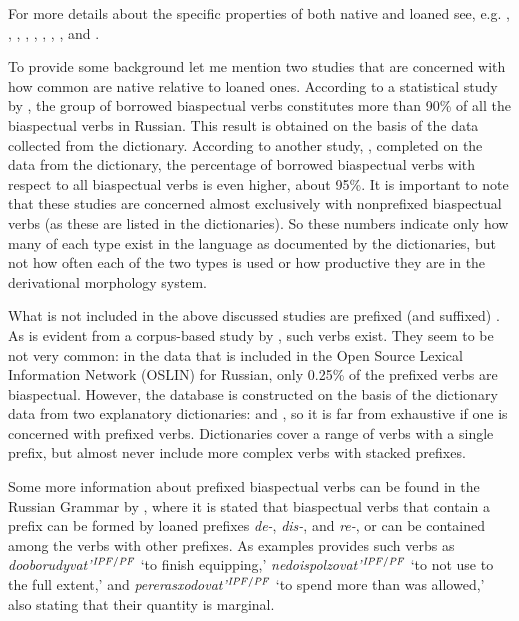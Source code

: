 For more details about the specific properties of both native and loaned  see, e.g. \citet{Isachenko:60}, \citet{Avilova:68}, \citet{Skott:79}, \citet{Gladney:82}, \citet{Certkova:98}, \citet{Jaszay:99}, \citet{Anderson:02}, \citet{Timberlake:04}, and \citet{Janda:07a}. 

To provide some background let me mention two studies that are concerned with how common are native  relative to loaned  ones. According to a statistical study by \citet{Certkova:98}, the group of borrowed biaspectual verbs constitutes more than 90\% of all the biaspectual verbs in Russian. This result is obtained on the basis of the data collected from the \citealt{Ozegov:90} dictionary. According to another study, \citealt{Anderson:02}, completed on the data from the \citealt{Zaliznjak:77} dictionary, the percentage of borrowed biaspectual verbs with respect to all biaspectual verbs is even higher, about 95\%. It is important to note that these studies are concerned almost exclusively with nonprefixed biaspectual verbs (as these are listed in the dictionaries). So these numbers indicate only how many  of each type exist in the language as documented by the dictionaries, but not how often each of the two types is used or how productive they are in the derivational morphology system.

What is not included in the above discussed studies are prefixed (and suffixed) . As is evident from a corpus-based study by \citet{Borik:12}, such verbs exist. They seem to be not very common: in the data that is included in the Open Source Lexical Information Network (OSLIN) for Russian, only 0.25\% of the prefixed verbs are biaspectual. However, the database is constructed on the basis of the dictionary data from two explanatory dictionaries: \citealt{Ushakov:50} and \citealt{OzegovShvedova:92}, so it is far from exhaustive if one is concerned with prefixed verbs. Dictionaries cover a range of verbs with a single prefix, but almost never include more complex verbs with stacked prefixes. 

Some more information about prefixed biaspectual verbs  can be found in the Russian Grammar by \citet{Shvedova:82}, where it is stated that biaspectual verbs that contain a prefix can be formed by loaned prefixes \textit {de-}, \textit {dis-}, and \textit{re-}, or can be contained among the verbs with other prefixes. As examples \citet{Shvedova:82} provides such verbs as  \textit{dooborudyvat'}$^{{\mathit{IPF}}/{\mathit{PF}}}$ `to finish equipping,' \textit{nedoispolzovat'}$^{{\mathit{IPF}}/{\mathit{PF}}}$ `to not use to the full extent,' and \textit{pererasxodovat'}$^{{\mathit{IPF}}/{\mathit{PF}}}$ `to spend more than was allowed,' also stating that their quantity is marginal. 

